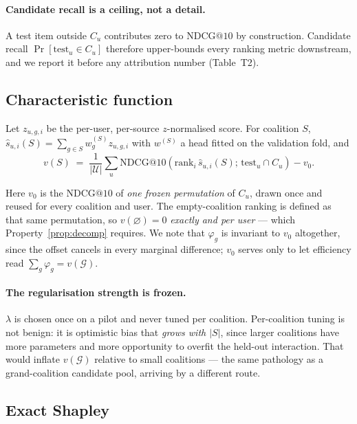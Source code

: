 \documentclass[11pt]{article}
\makeatletter
\newcommand{\G}{\mathcal{G}}
\newcommand{\Cu}{C_u}
\newcommand{\NDCG}{\mathrm{NDCG@10}}
\makeatother
\begin{document}
\paragraph{Candidate recall is a ceiling, not a detail.}
A test item outside $\Cu$ contributes zero to $\NDCG$ by construction.
Candidate recall $\Pr[\text{test}_u \in \Cu]$ therefore upper-bounds every
ranking metric downstream, and we report it before any attribution number
(Table~T2).

\subsection{Characteristic function}

Let $z_{u,g,i}$ be the per-user, per-source $z$-normalised score. For coalition
$S$, $\hat{s}_{u,i}(S) = \sum_{g \in S} w_g^{(S)} z_{u,g,i}$ with
$w^{(S)}$ a head fitted on the validation fold, and
\begin{equation}
v(S) \;=\; \frac{1}{|\mathcal{U}|} \sum_{u} \NDCG\!\left(
\text{rank}_i\, \hat{s}_{u,i}(S) ;\, \text{test}_u \cap \Cu \right) - v_0 .
\end{equation}

Here $v_0$ is the $\NDCG$ of \emph{one frozen permutation} of $\Cu$, drawn once
and reused for every coalition and user. The empty-coalition ranking is defined
as that same permutation, so $v(\varnothing) = 0$ \emph{exactly and per user} ---
which Property~\ref{prop:decomp} requires. We note that $\varphi_g$ is
invariant to $v_0$ altogether, since the offset cancels in every marginal
difference; $v_0$ serves only to let efficiency read
$\sum_g \varphi_g = v(\G)$.

\paragraph{The regularisation strength is frozen.}
$\lambda$ is chosen once on a pilot and never tuned per coalition. Per-coalition
tuning is not benign: it is optimistic bias that \emph{grows with $|S|$}, since
larger coalitions have more parameters and more opportunity to overfit the held-out
interaction. That would inflate $v(\G)$ relative to small coalitions --- the
same pathology as a grand-coalition candidate pool, arriving by a different
route.

\subsection{Exact Shapley}
\end{document}
